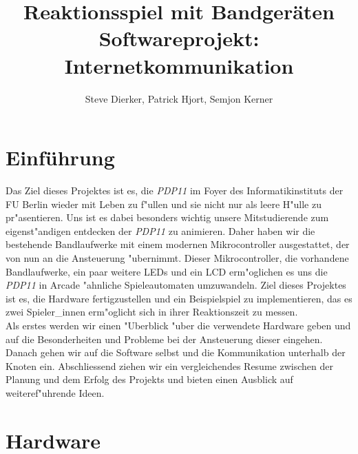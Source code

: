 \documentclass[a4paper]{article}
\title{%
  Reaktionsspiel mit Bandgeräten \\
  \large Softwareprojekt: Internetkommunikation}
\author{Steve Dierker, Patrick Hjort, Semjon Kerner}
\begin{document}
\maketitle

\section{Einführung}
  \label{sec:intro}
  Das Ziel dieses Projektes ist es, die \textit{PDP11} im Foyer des
  Informatikinstituts der FU Berlin wieder mit Leben zu f"ullen und sie nicht
  nur als leere H"ulle zu pr"asentieren. Uns ist es dabei besonders wichtig
  unsere Mitstudierende zum eigenst"andigen entdecken der \textit{PDP11} zu
  animieren.  Daher haben wir die bestehende Bandlaufwerke mit einem modernen
  Mikrocontroller ausgestattet, der von nun an die Ansteuerung "ubernimmt.
  Dieser Mikrocontroller, die vorhandene Bandlaufwerke, ein paar weitere LEDs
  und ein LCD erm"oglichen es uns die \textit{PDP11} in Arcade "ahnliche
  Spieleautomaten umzuwandeln. Ziel dieses Projektes ist es, die Hardware
  fertigzustellen und ein Beispielspiel zu implementieren, das es zwei
  Spieler\_innen erm"oglicht sich in ihrer Reaktionszeit zu messen.\\
  Als erstes werden wir einen "Uberblick "uber die verwendete Hardware geben
  und auf die Besonderheiten und Probleme bei der Ansteuerung dieser eingehen.
  Danach gehen wir auf die Software selbst und die Kommunikation unterhalb der
  Knoten ein. Abschliessend ziehen wir ein vergleichendes Resume zwischen der
  Planung und dem Erfolg des Projekts und bieten einen Ausblick auf
  weiteref"uhrende Ideen.

\section{Hardware}
  \label{sec:hardware}
\end{document}
